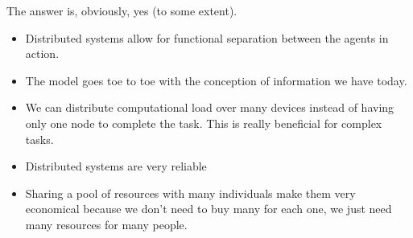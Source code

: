 The answer is, obviously, yes (to some extent). 
\begin{itemize}
    \item Distributed systems allow for functional separation between the agents in action.
    \item The model goes toe to toe with the conception of information we have today.
    \item We can distribute computational load over many devices instead of having only one node to complete the task. This is really beneficial for complex tasks.
    \item Distributed systems are very reliable
    \item Sharing a pool of resources with many individuals make them very economical because we don't need to buy many for each one, we just need many resources for many people.
\end{itemize}